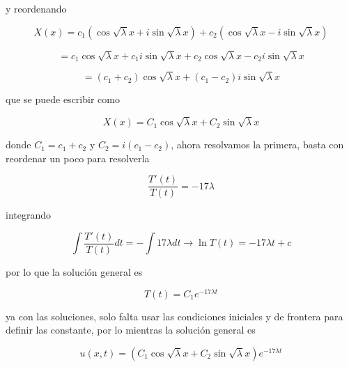 \documentclass[12pt,a4paper]{article}
\begin{document}
\begin{enumerate}
    y reordenando
    
    \begin{equation*}
        X(x) = c_1 (\cos{\sqrt{\lambda}x}+ i\sin{\sqrt{\lambda}x}) + c_2 (\cos{\sqrt{\lambda }x} - i \sin{\sqrt{\lambda}x})
    \end{equation*}
    
    \begin{equation*}
        = c_1\cos{\sqrt{\lambda}x}+c_1 i\sin{\sqrt{\lambda}x} + c_2\cos{\sqrt{\lambda }x} - c_2 i \sin{\sqrt{\lambda}x}
    \end{equation*}
    
    \begin{equation*}
        = (c_1+c_2)\cos{\sqrt{\lambda}x}+(c_1-c_2) i\sin{\sqrt{\lambda}x}
    \end{equation*}
    
    que se puede escribir como
    
    \begin{equation*}
        X(x)= C_1\cos{\sqrt{\lambda}x}+C_2\sin{\sqrt{\lambda}x}
    \end{equation*}
    
    donde $C_1 = c_1 + c_2$ y $C_2 = i(c_1-c_2)$, ahora resolvamos la primera, basta con reordenar un poco para resolverla
    
    \begin{equation*}
        \frac{T'(t)}{T(t)}= -17\lambda
    \end{equation*}
    
    integrando
    
    \begin{equation*}
        \int \frac{T'(t)}{T(t)} dt= -\int 17\lambda dt \rightarrow \ln{T(t)} = -17 \lambda t + c
    \end{equation*}
    
    por lo que la solución general es
    
    \begin{equation*}
        T(t) = C_1 e^{-17\lambda t}
    \end{equation*}
    
    ya con las soluciones, solo falta usar las condiciones iniciales y de frontera para definir las constante, por lo mientras la solución general es
    
    \begin{equation*}
        u(x,t) = (C_1\cos{\sqrt{\lambda}x}+C_2\sin{\sqrt{\lambda}x}) e^{-17\lambda t}
    \end{equation*}
    

\end{enumerate}
\end{document}

